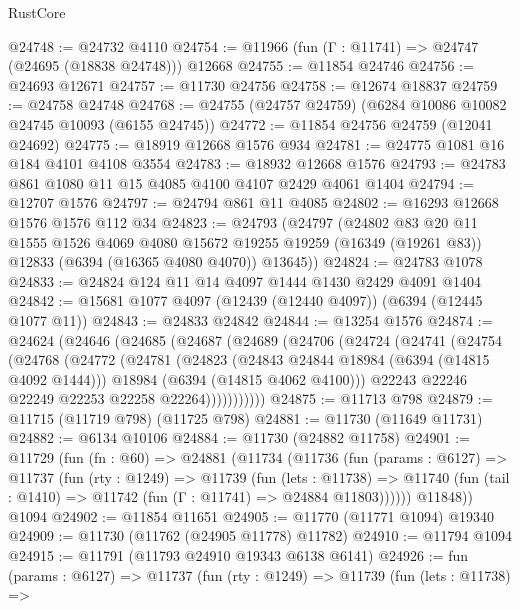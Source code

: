 \begin{lexlean}{RustCore}
\begin{coremodule}
@24748 := @24732 @4110
@24754 := @11966 (fun (Γ : @11741) => @24747 (@24695 (@18838 @24748))) @12668
@24755 := @11854 @24746
@24756 := @24693 @12671
@24757 := @11730 @24756
@24758 := @12674 @18837
@24759 := @24758 @24748
@24768 := @24755 (@24757 @24759) (@6284 @10086 @10082 @24745 @10093 (@6155 @24745))
@24772 := @11854 @24756 @24759 (@12041 @24692)
@24775 := @18919 @12668 @1576 @934
@24781 := @24775 @1081 @16 @184 @4101 @4108 @3554
@24783 := @18932 @12668 @1576
@24793 := @24783 @861 @1080 @11 @15 @4085 @4100 @4107 @2429 @4061 @1404
@24794 := @12707 @1576
@24797 := @24794 @861 @11 @4085
@24802 := @16293 @12668 @1576 @1576 @112 @34
@24823 := @24793
    (@24797
      (@24802
        @83
        @20
        @11
        @1555
        @1526
        @4069
        @4080
        @15672
        @19255
        @19259
        (@16349 (@19261 @83))
        @12833
        (@6394 (@16365 @4080 @4070))
        @13645))
@24824 := @24783 @1078
@24833 := @24824 @124 @11 @14 @4097 @1444 @1430 @2429 @4091 @1404
@24842 := @15681 @1077 @4097 (@12439 (@12440 @4097)) (@6394 (@12445 @1077 @11))
@24843 := @24833 @24842
@24844 := @13254 @1576
@24874 := @24624
    (@24646
      (@24685
        (@24687
          (@24689
            (@24706
              (@24724
                (@24741
                  (@24754
                    (@24768
                      (@24772
                        (@24781
                          (@24823
                            (@24843 @24844 @18984 (@6394 (@14815 @4092 @1444)))
                            @18984
                            (@6394 (@14815 @4062 @4100)))
                          @22243
                          @22246
                          @22249
                          @22253
                          @22258
                          @22264)))))))))))
@24875 := @11713 @798
@24879 := @11715 (@11719 @798) (@11725 @798)
@24881 := @11730 (@11649 @11731)
@24882 := @6134 @10106
@24884 := @11730 (@24882 @11758)
@24901 := @11729
    (fun (fn : @60) =>
    @24881
      (@11734
        (@11736
          (fun (params : @6127) =>
          @11737
            (fun (rty : @1249) =>
            @11739
              (fun (lets : @11738) =>
              @11740 (fun (tail : @1410) => @11742 (fun (Γ : @11741) => @24884 @11803))))))
        @11848))
    @1094
@24902 := @11854 @11651
@24905 := @11770 (@11771 @1094) @19340
@24909 := @11730 (@11762 (@24905 @11778) @11782)
@24910 := @11794 @1094
@24915 := @11791 (@11793 @24910 @19343 @6138 @6141)
@24926 := fun (params : @6127) =>
  @11737
    (fun (rty : @1249) =>
    @11739
      (fun (lets : @11738) =>

\end{coremodule}
\end{lexlean}
